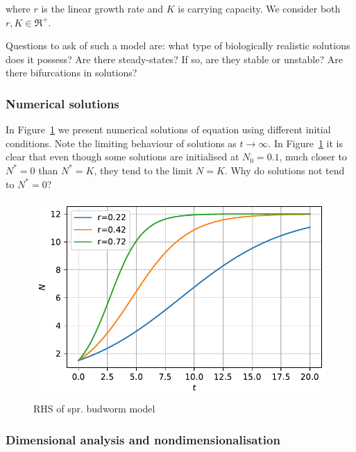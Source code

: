 \documentclass[
  letterpaper,
  DIV=11,
  numbers=noendperiod]{scrreprt}
\begin{document}
where \(r\) is the linear growth rate and \(K\) is carrying capacity. We
consider both \(r,K\in \Re^+\).

Questions to ask of such a model are: what type of biologically
realistic solutions does it possess? Are there steady-states? If so, are
they stable or unstable? Are there bifurcations in solutions?

\hypertarget{numerical-solutions}{%
\subsubsection{Numerical solutions}\label{numerical-solutions}}

In Figure~\ref{fig-logisticgrowthmodel} we present numerical solutions
of equation using different initial conditions. Note the limiting
behaviour of solutions as \(t\rightarrow \infty\). In
Figure~\ref{fig-logisticgrowthmodel} it is clear that even though some
solutions are initialised at \(N_0=0.1\), much closer to \(N^*=0\) than
\(N^*=K\), they tend to the limit \(N=K\). Why do solutions not tend to
\(N^*=0\)?

\begin{figure}

{\centering \includegraphics{SinglePopODEMOdels_files/figure-pdf/fig-logisticgrowthmodel-output-1.pdf}

}

\caption{\label{fig-logisticgrowthmodel}RHS of spr. budworm model}

\end{figure}

\hypertarget{dimensional-analysis-and-nondimensionalisation}{%
\subsubsection{Dimensional analysis and
nondimensionalisation}\label{dimensional-analysis-and-nondimensionalisation}}
\end{document}
